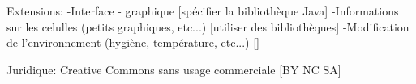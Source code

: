 \documentclass[12pt,a4paper]{report}
\begin{document}
\begin{flushleft}
Extensions:
-Interface - graphique [spécifier la bibliothèque Java]
-Informations sur les celulles (petits graphiques, etc...) [utiliser des bibliothèques]
-Modification de l'environnement (hygiène, température, etc...) []
\end{flushleft}

\begin{flushleft}
Juridique: Creative Commons sans usage commerciale [BY NC SA]
\end{flushleft}

\tableofcontents
\end{document}
